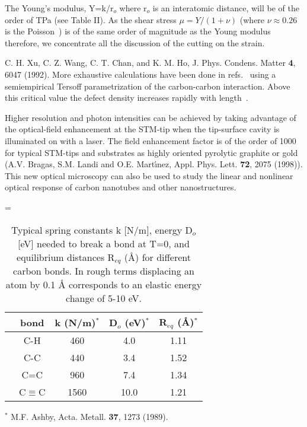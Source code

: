 \begin{multicols}{2}
\begin{thebibliography}{99}
 The Young's modulus, Y=k/r$_{o}$ where r$_{o}$
is an interatomic distance, will be of the order of TPa (see Table
II). As the shear stress $\mu =Y/(1+\nu )$ (where $\nu \approx
0.26$ is the Poisson~\cite{Hernandez}) is of the same order of magnitude as
the Young modulus therefore, we concentrate all the discussion of
the cutting on the strain.

  C. H. Xu, C. Z. Wang, C. T. Chan, and K. M. Ho, J. Phys.
Condens. Matter {\bf 4}, 6047 (1992).
 More exhaustive calculations have
been done in refs.~\cite{Marco,Paul} using a semiempirical Tersoff
parametrization of the carbon-carbon interaction.
Above this critical value the defect density
increases rapidly with length~\cite{Paul}.

 Higher resolution and photon intensities can
be achieved by taking advantage of the optical-field enhancement
at the STM-tip when the tip-surface cavity is illuminated on with
a laser. The field enhancement factor is of the order of 1000 for
typical STM-tips and substrates as highly oriented pyrolytic
graphite or gold (A.V. Bragas, S.M. Landi and O.E. Mart\'{\i }nez,
Appl. Phys. Lett. {\bf 72}, 2075 (1998)). This new optical
microscopy can also be used to study the linear and nonlinear
optical response of carbon nanotubes and other nanostructures.

\end{thebibliography}




 = \hbox{\cite{Hernandez}}
\begin{table}
\caption{ Typical spring constants k [N/m], energy D$_{o}$ [eV]
needed to break a bond at T=0, and equilibrium distances R$_{eq}$
({\AA}) for different carbon bonds. In rough terms
displacing an atom by 0.1 {\AA} corresponds to an elastic energy
change of 5-10 eV.
}
\begin{tabular}{c|c|c|c|c|}
& bond & k (N/m)$^*$ & D$_{o}$ (eV)$^*$ & R$_{eq}$ ({\AA})$^*$ \\ \hline
& C-H & 460 & 4.0 & 1.11 \\ & C-C & 440 & 3.4 & 1.52 \\
 & C=C &960 & 7.4 & 1.34 \\ & C$\equiv$C & 1560 & 10.0 & 1.21 \\
\end{tabular}
$^*$ M.F. Ashby, Acta. Metall. {\bf 37}, 1273 (1989).
\end{table}



\end{multicols}

